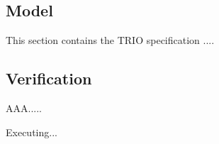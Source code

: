 \subsection{Model}
This section contains the TRIO specification ....


%

\subsection{Verification}
AAA.....
\vspace{10mm}

Executing...